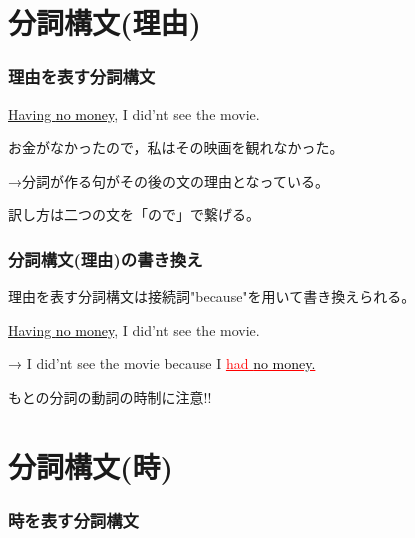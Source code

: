 \documentclass[xcolor=dvipsnames,unicode,14pt]{beamer}%
\begin{document}
\section{分詞構文(理由)}
\begin{frame}
  \frametitle{理由を表す分詞構文}

  \textcolor{NavyBlue}{\underline{Having \textcolor{black}{no money}}}, I did'nt see the movie.

  お金がなかったので，私はその映画を観れなかった。

  →分詞が作る句がその後の文の理由となっている。

  訳し方は二つの文を「ので」で繋げる。
\end{frame}
\begin{frame}
  \frametitle{分詞構文(理由)の書き換え}

  理由を表す分詞構文は接続詞"because"を用いて書き換えられる。

  \textcolor{NavyBlue}{\underline{Having \textcolor{black}{no money}}}, I did'nt see the movie.

  → I did'nt see the movie \textcolor{NavyBlue}{because}
   I \textcolor{Red}{\underline{had \textcolor{black}{no money.}}}

  もとの分詞の動詞の時制に注意!!

\end{frame}

\section{分詞構文(時)}
\begin{frame}
  \frametitle{時を表す分詞構文}

  

\end{frame}
\end{document}
